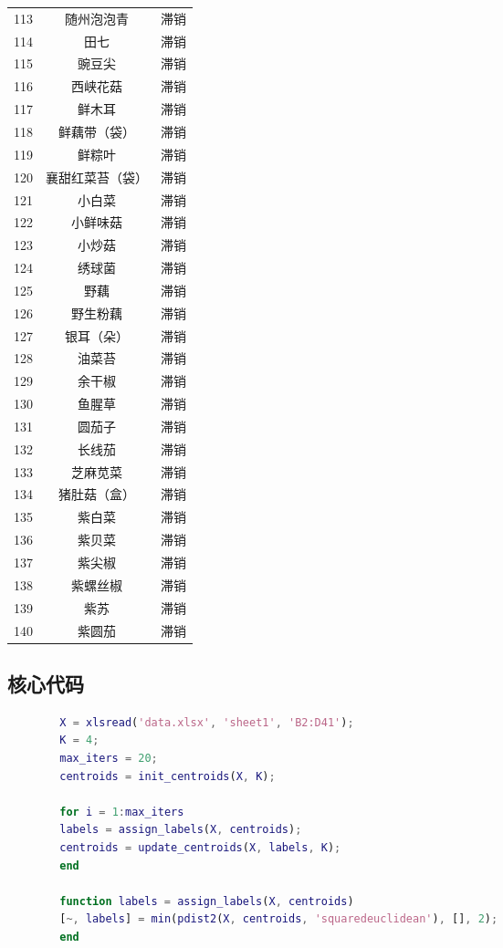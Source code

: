 \documentclass[a4paper,12pt]{article}
\begin{document}
\begin{longtable}{c|c|c}
		113 & 随州泡泡青 & 滞销 \\
		114 & 田七 & 滞销 \\
		115 & 豌豆尖 & 滞销 \\
		116 & 西峡花菇 & 滞销 \\
		117 & 鲜木耳 & 滞销 \\
		118 & 鲜藕带（袋） & 滞销 \\
		119 & 鲜粽叶 & 滞销 \\
		120 & 襄甜红菜苔（袋） & 滞销 \\
		121 & 小白菜 & 滞销 \\
		122 & 小鲜味菇 & 滞销 \\
		123 & 小炒菇 & 滞销 \\
		124 & 绣球菌 & 滞销 \\
		125 & 野藕 & 滞销 \\
		126 & 野生粉藕 & 滞销 \\
		127 & 银耳（朵） & 滞销 \\
		128 & 油菜苔 & 滞销 \\
		129 & 余干椒 & 滞销 \\
		130 & 鱼腥草 & 滞销 \\
		131 & 圆茄子 & 滞销 \\
		132 & 长线茄 & 滞销 \\
		133 & 芝麻苋菜 & 滞销 \\
		134 & 猪肚菇（盒） & 滞销 \\
		135 & 紫白菜 & 滞销 \\
		136 & 紫贝菜 & 滞销 \\
		137 & 紫尖椒 & 滞销 \\
		138 & 紫螺丝椒 & 滞销 \\
		139 & 紫苏 & 滞销 \\
		140 & 紫圆茄 & 滞销 \\
		
	\end{longtable}
	
	\newpage
	
	\subsection{核心代码}
	
	\begin{lstlisting}[language=Matlab, basicstyle=\small\ttfamily]
		% K-means++ clustering
		X = xlsread('data.xlsx', 'sheet1', 'B2:D41');
		K = 4;
		max_iters = 20;
		centroids = init_centroids(X, K);
		
		for i = 1:max_iters
		labels = assign_labels(X, centroids);
		centroids = update_centroids(X, labels, K);
		end
		
		function labels = assign_labels(X, centroids)
		[~, labels] = min(pdist2(X, centroids, 'squaredeuclidean'), [], 2);
		end
	\end{lstlisting}
	
\end{document}
